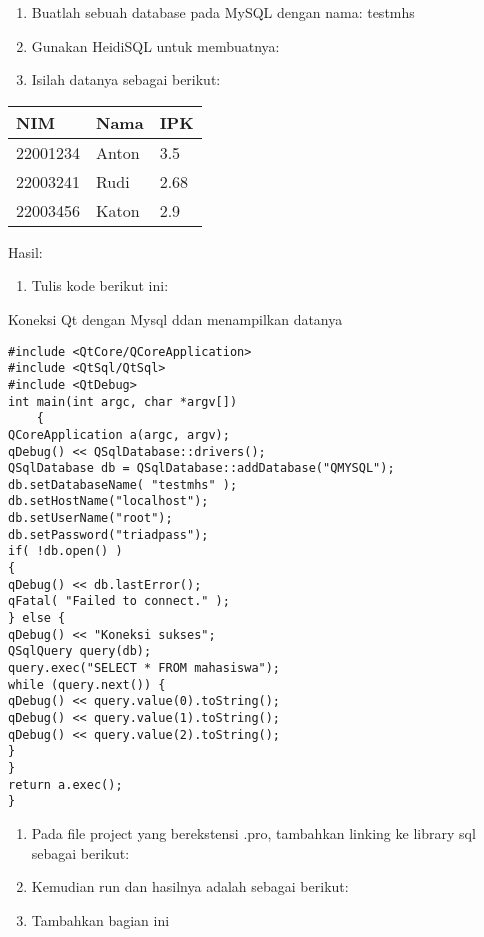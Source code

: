\begin{enumerate}
\def\labelenumi{\arabic{enumi}.}
\tightlist
\item
  Buatlah sebuah database pada MySQL dengan nama: testmhs
\item
  Gunakan HeidiSQL untuk membuatnya:
\item
  Isilah datanya sebagai berikut:
\end{enumerate}

\begin{longtable}[]{@{}lll@{}}
\toprule
NIM & Nama & IPK\tabularnewline
\midrule
\endhead
22001234 & Anton & 3.5\tabularnewline
22003241 & Rudi & 2.68\tabularnewline
22003456 & Katon & 2.9\tabularnewline
\bottomrule
\end{longtable}

Hasil:

\begin{enumerate}
\def\labelenumi{\arabic{enumi}.}
\setcounter{enumi}{3}
\tightlist
\item
  Tulis kode berikut ini:
\end{enumerate}

Koneksi Qt dengan Mysql ddan menampilkan datanya

\begin{verbatim}
#include <QtCore/QCoreApplication>
#include <QtSql/QtSql>
#include <QtDebug>
int main(int argc, char *argv[])
    {
QCoreApplication a(argc, argv);
qDebug() << QSqlDatabase::drivers();
QSqlDatabase db = QSqlDatabase::addDatabase("QMYSQL");
db.setDatabaseName( "testmhs" );
db.setHostName("localhost");
db.setUserName("root");
db.setPassword("triadpass");
if( !db.open() )
{
qDebug() << db.lastError();
qFatal( "Failed to connect." );
} else {
qDebug() << "Koneksi sukses";
QSqlQuery query(db);
query.exec("SELECT * FROM mahasiswa");
while (query.next()) {
qDebug() << query.value(0).toString();
qDebug() << query.value(1).toString();
qDebug() << query.value(2).toString();
}
}
return a.exec();
}
\end{verbatim}

\begin{enumerate}
\def\labelenumi{\arabic{enumi}.}
\setcounter{enumi}{4}
\item
  Pada file project yang berekstensi .pro, tambahkan linking ke library
  sql sebagai berikut:
\item
  Kemudian run dan hasilnya adalah sebagai berikut:
\item
  Tambahkan bagian ini
\end{enumerate}

